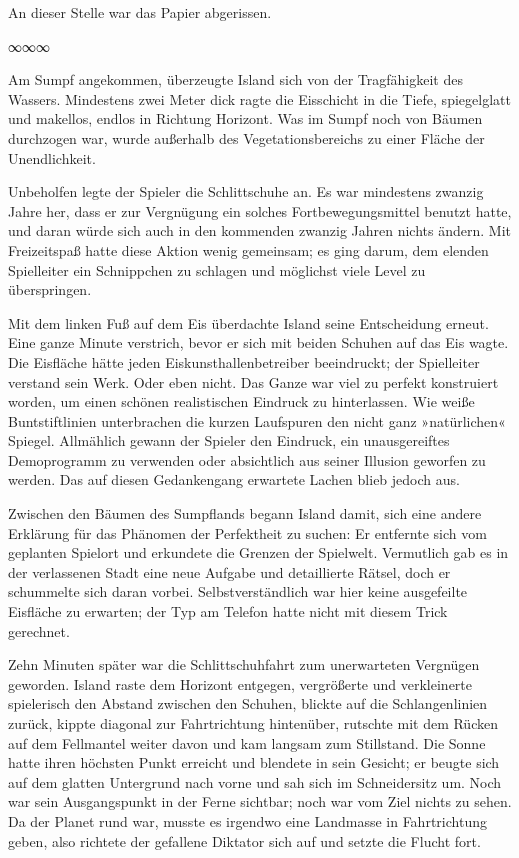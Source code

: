 An dieser Stelle war das Papier abgerissen.

\begin{center}
	∞∞∞
\end{center}

Am Sumpf angekommen, überzeugte Island sich von der Tragfähigkeit des Wassers. Mindestens zwei Meter dick ragte die Eisschicht in die Tiefe, spiegelglatt und makellos, endlos in Richtung Horizont. Was im Sumpf noch von Bäumen durchzogen war, wurde außerhalb des Vegetationsbereichs zu einer Fläche der Unendlichkeit.

Unbeholfen legte der Spieler die Schlittschuhe an. Es war mindestens zwanzig Jahre her, dass er zur Vergnügung ein solches Fortbewegungsmittel benutzt hatte, und daran würde sich auch in den kommenden zwanzig Jahren nichts ändern. Mit Freizeitspaß hatte diese Aktion wenig gemeinsam; es ging darum, dem elenden Spielleiter ein Schnippchen zu schlagen und möglichst viele Level zu überspringen.

Mit dem linken Fuß auf dem Eis überdachte Island seine Entscheidung erneut. Eine ganze Minute verstrich, bevor er sich mit beiden Schuhen auf das Eis wagte. Die Eisfläche hätte jeden Eiskunsthallenbetreiber beeindruckt; der Spielleiter verstand sein Werk. Oder eben nicht. Das Ganze war viel zu perfekt konstruiert worden, um einen schönen realistischen Eindruck zu hinterlassen. Wie weiße Buntstiftlinien unterbrachen die kurzen Laufspuren den nicht ganz »natürlichen« Spiegel. Allmählich gewann der Spieler den Eindruck, ein unausgereiftes Demoprogramm zu verwenden oder absichtlich aus seiner Illusion geworfen zu werden. Das auf diesen Gedankengang erwartete Lachen blieb jedoch aus.

Zwischen den Bäumen des Sumpflands begann Island damit, sich eine andere Erklärung für das Phänomen der Perfektheit zu suchen: Er entfernte sich vom geplanten Spielort und erkundete die Grenzen der Spielwelt. Vermutlich gab es in der verlassenen Stadt eine neue Aufgabe und detaillierte Rätsel, doch er schummelte sich daran vorbei. Selbstverständlich war hier keine ausgefeilte Eisfläche zu erwarten; der Typ am Telefon hatte nicht mit diesem Trick gerechnet.

Zehn Minuten später war die Schlittschuhfahrt zum unerwarteten Vergnügen geworden. Island raste dem Horizont entgegen, vergrößerte und verkleinerte spielerisch den Abstand zwischen den Schuhen, blickte auf die Schlangenlinien zurück, kippte diagonal zur Fahrtrichtung hintenüber, rutschte mit dem Rücken auf dem Fellmantel weiter davon und kam langsam zum Stillstand. Die Sonne hatte ihren höchsten Punkt erreicht und blendete in sein Gesicht; er beugte sich auf dem glatten Untergrund nach vorne und sah sich im Schneidersitz um. Noch war sein Ausgangspunkt in der Ferne sichtbar; noch war vom Ziel nichts zu sehen. Da der Planet rund war, musste es irgendwo eine Landmasse in Fahrtrichtung geben, also richtete der gefallene Diktator sich auf und setzte die Flucht fort.

